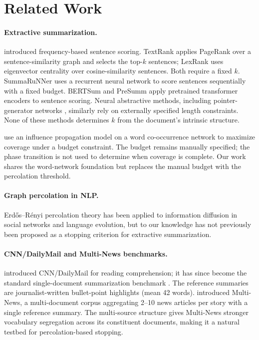 \documentclass[11pt,letterpaper]{article}
\begin{document}
\section{Related Work}

\paragraph{Extractive summarization.}
\citet{Luhn1958} introduced frequency-based sentence scoring. TextRank
\citep{Mihalcea2004} applies PageRank \citep{Page1999} over a sentence-similarity graph
and selects the top-$k$ sentences; LexRank \citep{Erkan2004} uses eigenvector centrality
over cosine-similarity sentences. Both require a fixed $k$. SummaRuNNer
\citep{Nallapati2017} uses a recurrent neural network to score sentences sequentially
with a fixed budget. BERTSum \citep{Liu2019bert} and PreSumm \citep{Liu2019presumm}
apply pretrained transformer encoders to sentence scoring. Neural abstractive methods,
including pointer-generator networks \citep{See2017}, similarly rely on externally
specified length constraints. None of these methods determines $k$ from the document's
intrinsic structure.

\citet{Ryang2012} use an influence propagation model on a word co-occurrence network to
maximize coverage under a budget constraint. The budget remains manually specified; the
phase transition is not used to determine when coverage is complete. Our work shares the
word-network foundation but replaces the manual budget with the percolation threshold.

\paragraph{Graph percolation in NLP.}
Erd{\H o}s--R\'enyi percolation theory \citep{ErdosRenyi1960,Bollobas2001} has been
applied to information diffusion in social networks and language evolution, but to our
knowledge has not previously been proposed as a stopping criterion for extractive
summarization.

\paragraph{CNN/DailyMail and Multi-News benchmarks.}
\citet{Hermann2015} introduced CNN/DailyMail for reading comprehension; it has since
become the standard single-document summarization benchmark \citep{See2017}. The
reference summaries are journalist-written bullet-point highlights (mean 42 words).
\citet{Fabbri2019} introduced Multi-News, a multi-document corpus aggregating 2--10 news
articles per story with a single reference summary. The multi-source structure gives
Multi-News stronger vocabulary segregation across its constituent documents, making it a
natural testbed for percolation-based stopping.
\end{document}
